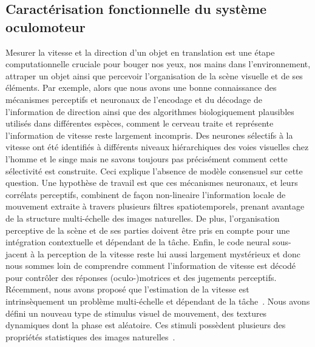 \documentclass[11pt,french,a4paper,oneside]{article}%
\begin{document}
\subsection{Caractérisation fonctionnelle du système oculomoteur~\citep{Sanz12,Simoncini12}}%
\label{sec:motionclouds}
Mesurer la vitesse et la direction d'un objet en translation est une étape computationnelle cruciale pour bouger nos yeux, nos mains dans l'environnement, attraper un objet ainsi que percevoir l'organisation de la scène visuelle et de ses éléments. Par exemple, alors que nous avons une bonne connaissance des mécanismes perceptifs et neuronaux de l'encodage et du décodage de l'information de direction ainsi que des algorithmes biologiquement plausibles utilisés dans différentes espèces, comment le cerveau traite et représente l'information de vitesse reste largement incompris. Des neurones sélectifs à la vitesse ont été identifiés à différents niveaux hiérarchiques des voies visuelles chez l'homme et le singe mais ne savons toujours pas précisément comment cette sélectivité est construite. Ceci explique l'absence de modèle consensuel sur cette question. Une hypothèse de travail est que ces mécanismes neuronaux, et leurs corrélats perceptifs, combinent de façon non-lineaire l'information locale de mouvement extraite à travers plusieurs filtres spatiotemporels, prenant avantage de la structure multi-échelle des images naturelles. De plus, l'organisation perceptive de la scène et de ses parties doivent être pris en compte pour une intégration contextuelle et dépendant de la tâche. Enfin, le code neural sous-jacent à la perception de la vitesse reste lui aussi largement mystérieux et donc nous sommes loin de comprendre comment l'information de vitesse est décodé pour contrôler des réponses (oculo-)motrices et des jugements perceptifs. Récemment, nous avons proposé que l'estimation de la vitesse est intrinsèquement un problème multi-échelle et dépendant de la tâche~\citep{Simoncini12}. Nous avons défini un nouveau type de stimulus visuel de mouvement, des textures dynamiques dont la phase est aléatoire. Ces stimuli possèdent plusieurs des propriétés statistiques des images naturelles~\citep{Sanz12,Vacher15nips}.
\end{document}
